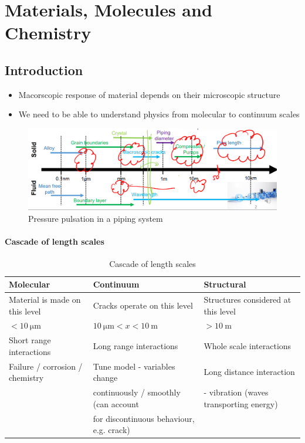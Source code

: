 \documentclass[class=report, crop=false, 12pt,a4paper]{standalone}
\begin{document}
\chapter{Materials, Molecules and Chemistry}
\section{Introduction}
\begin{itemize}
	\item Macorscopic response of material depends on their microscopic structure
	\item We need to be able to understand physics from molecular to continuum scales
\end{itemize}
\begin{figure}[H]
	\centering
	\includegraphics[width = \textwidth]{../img/figure1.png}
	\caption{Pressure pulsation in a piping system}
\end{figure}
\subsubsection{Cascade of length scales}
\begin{table}
\begin{adjustbox}{width=\columnwidth,center}
	\begin{tabular}{@{}lll@{}}
		\toprule
		\textbf{Molecular} & \textbf{Continuum} & \textbf{Structural}\\
		\midrule
		Material is made on this level & Cracks operate on this level & Structures considered at this level\\
		$< \SI{10}{\micro\meter}$ & $\SI{10}{\micro\meter} < x < \SI{10}{\meter}$ & $> \SI{10}{\meter}$\\
		Short range interactions & Long range interactions & Whole scale interactions\\
		Failure / corrosion / chemistry & Tune model - variables change & Long distance interaction \\
		& continuously / smoothly (can account & - vibration (waves transporting energy)\\
		& for discontinuous behaviour, e.g. crack) & \\
		\bottomrule
	\end{tabular}
\end{adjustbox}
\caption{Cascade of length scales}
\end{table}
\end{document}
